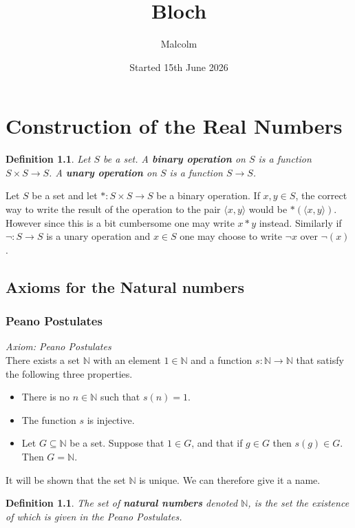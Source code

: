 \documentclass{report}
\title{Bloch}
\date{Started 15th June 2026}
\author{Malcolm}
\newtheorem{definition}[theo]{Definition}
\begin{document}
\maketitle

\tableofcontents

\chapter{Construction of the Real Numbers}
\begin{definition}
Let $S$ be a set. A \textbf{binary operation} on $S$ is a function $S\times S\to S$. A
\textbf{unary operation} on $S$ is a function $S\to S$.
\end{definition}
\noindent Let $S$ be a set and let $*:S\times S\to S$ be a binary operation. If $x,y\in S$, the correct way to write the result of the operation to the pair $\langle x,y\rangle$ would be
$*(\langle x,y\rangle)$. However since this is a bit cumbersome one may write $x*y$ instead.
Similarly if $\neg:S\to S$ is a unary operation and $x\in S$ one may choose to write $\neg x$ over $\neg(x)$.

\section{Axioms for the Natural numbers}
\subsection{Peano Postulates}
\textit{Axiom: Peano Postulates}\\
There exists a set $\mathbb N$ with an element $1\in\mathbb N$ and a function $s:\mathbb N\to\mathbb N$ that satisfy the following three properties.
\begin{itemize}
\item There is no $n\in\mathbb N$ such that $s(n)=1$.
\item The function $s$ is injective.
\item Let $G\subseteq\mathbb N$ be a set. Suppose that $1\in G$, and that if $g\in G$ then $s(g)\in G$. Then $G=\mathbb N$.
\end{itemize}
It will be shown that the set $\mathbb N$ is unique. We can therefore give it a name.
\begin{definition}
The set of \textbf{natural numbers} denoted $\mathbb N$, is the set the existence of which is given in the Peano Postulates.
\end{definition}
\newpage
\end{document}
